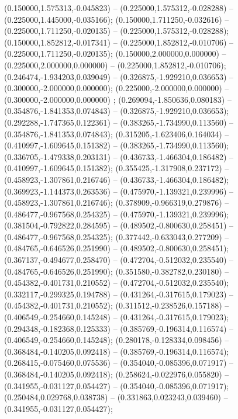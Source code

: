  (0.150000,1.575313,-0.045823) -- (0.225000,1.575312,-0.028288) -- (0.225000,1.445000,-0.035166);
 (0.150000,1.711250,-0.032616) -- (0.225000,1.711250,-0.020135) -- (0.225000,1.575312,-0.028288);
 (0.150000,1.852812,-0.017341) -- (0.225000,1.852812,-0.010706) -- (0.225000,1.711250,-0.020135);
 (0.150000,2.000000,0.000000) -- (0.225000,2.000000,0.000000) -- (0.225000,1.852812,-0.010706);
 (0.246474,-1.934203,0.039049) -- (0.326875,-1.929210,0.036653) -- (0.300000,-2.000000,0.000000);
 (0.225000,-2.000000,0.000000) -- (0.300000,-2.000000,0.000000) ;
 (0.269094,-1.850636,0.080183) -- (0.354876,-1.841353,0.074843) -- (0.326875,-1.929210,0.036653);
 (0.292288,-1.747365,0.122361) -- (0.383265,-1.734990,0.113560) -- (0.354876,-1.841353,0.074843);
 (0.315205,-1.623406,0.164034) -- (0.410997,-1.609645,0.151382) -- (0.383265,-1.734990,0.113560);
 (0.336705,-1.479338,0.203131) -- (0.436733,-1.466304,0.186482) -- (0.410997,-1.609645,0.151382);
 (0.355425,-1.317908,0.237172) -- (0.458923,-1.307861,0.216746) -- (0.436733,-1.466304,0.186482);
 (0.369923,-1.144373,0.263536) -- (0.475970,-1.139321,0.239996) -- (0.458923,-1.307861,0.216746);
 (0.378909,-0.966319,0.279876) -- (0.486477,-0.967568,0.254325) -- (0.475970,-1.139321,0.239996);
 (0.381504,-0.792822,0.284595) -- (0.489502,-0.800630,0.258451) -- (0.486477,-0.967568,0.254325);
 (0.377442,-0.633043,0.277209) -- (0.484765,-0.646526,0.251990) -- (0.489502,-0.800630,0.258451);
 (0.367137,-0.494677,0.258470) -- (0.472704,-0.512032,0.235540) -- (0.484765,-0.646526,0.251990);
 (0.351580,-0.382782,0.230180) -- (0.454382,-0.401731,0.210552) -- (0.472704,-0.512032,0.235540);
 (0.332117,-0.299325,0.194788) -- (0.431264,-0.317615,0.179023) -- (0.454382,-0.401731,0.210552);
 (0.311512,-0.238526,0.157188) -- (0.406549,-0.254660,0.145248) -- (0.431264,-0.317615,0.179023);
 (0.294348,-0.182368,0.125333) -- (0.385769,-0.196314,0.116574) -- (0.406549,-0.254660,0.145248);
 (0.280178,-0.128334,0.098456) -- (0.368484,-0.140205,0.092418) -- (0.385769,-0.196314,0.116574);
 (0.268415,-0.075460,0.075536) -- (0.354040,-0.085396,0.071917) -- (0.368484,-0.140205,0.092418);
 (0.258624,-0.022976,0.055820) -- (0.341955,-0.031127,0.054427) -- (0.354040,-0.085396,0.071917);
 (0.250484,0.029768,0.038738) -- (0.331863,0.023243,0.039460) -- (0.341955,-0.031127,0.054427);
